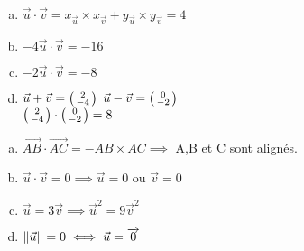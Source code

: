 \documentclass[12pt, a4paper]{article}
\DeclarePairedDelimiter\norm{\lVert}{\rVert}
\begin{document}
\begin{Exercise}[number={58}]
  \begin{enumerate}[a)]
    \item $\vec{u}\cdot\vec{v}=x_{\vec{u}}\times x_{\vec{v}}+y_{\vec{u}}\times y_{\vec{v}}=4$
    \item $-4\vec{u}\cdot\vec{v}=-16$
    \item $-2\vec{u}\cdot\vec{v}=-8$
    \item $\vec{u}+\vec{v}=\begin{psmallmatrix}2\\-4\end{psmallmatrix}$ \quad $\vec{u}-\vec{v}=\begin{psmallmatrix}0\\-2\end{psmallmatrix}$ \smallskip \\ $\begin{psmallmatrix}2\\-4\end{psmallmatrix}\cdot\begin{psmallmatrix}0\\-2\end{psmallmatrix}=8$
  \end{enumerate}
\end{Exercise}

\begin{Exercise}[number={60}]
  \begin{enumerate}[a)]
    \item $\overrightarrow{AB}\cdot\overrightarrow{AC}=-AB\times AC\implies$ A,B et C sont alignés.
    \item $\vec{u}\cdot\vec{v}=0\implies\vec{u}=0$ ou $\vec{v}=0$
    \item $\vec{u}=3\vec{v}\implies\vec{u}^2=9\vec{v}^2$
    \item $\norm{\vec{u}}=0\iff\vec{u}=\overrightarrow{0}$
  \end{enumerate}
\end{Exercise}
\end{document}
